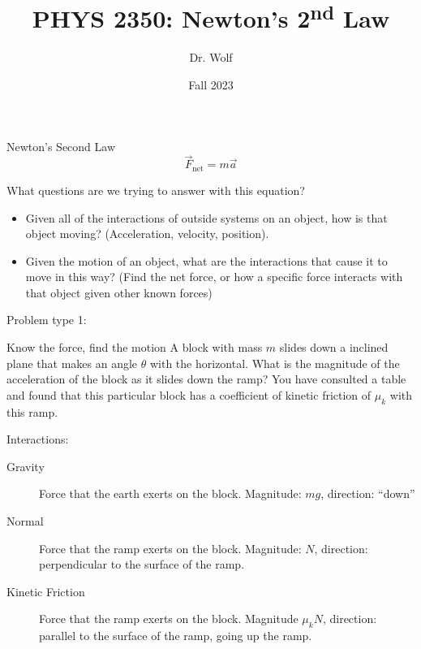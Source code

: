 \documentclass[aspectratio=169]{beamer}
\title{PHYS 2350: Newton's 2\textsuperscript{nd} Law}
\author{Dr. Wolf}
\date{Fall 2023}
\begin{document}
\begin{frame}
  \titlepage
\end{frame}

\begin{frame}
  {Newton's Second Law}
  \[
    \vec{F}_{\text{net}} = m\vec{a}
  \]
  \begin{block}
    {What questions are we trying to answer with this equation?}
      \begin{itemize}
        \item Given all of the interactions of outside systems on an object, how is that object
        moving? (Acceleration, velocity, position).  
        \item Given the motion of an object, what are the interactions that cause it to move in
        this way? (Find the net force, or how a specific force interacts with that object given
        other known forces)
      \end{itemize}
  \end{block}
\end{frame}

\begin{frame}
  {Problem type 1:}
  \begin{block}
    {Know the force, find the motion} A block with mass $m$ slides down a inclined plane that
    makes an angle $\theta$ with the horizontal.  What is the magnitude of the acceleration of
    the block as it slides down the ramp? You have consulted a table and found that this
    particular block has a coefficient of kinetic friction of $\mu_k$ with this ramp.
  \end{block}
  Interactions:
  \begin{description}
    \item[Gravity] Force that the earth exerts on the block.  Magnitude: $mg$, direction:
    ``down''
    \item[Normal] Force that the ramp exerts on the block. Magnitude: $N$, direction:
    perpendicular to the surface of the ramp.
    \item[Kinetic Friction] Force that the ramp exerts on the block.  Magnitude $\mu_k N$,
    direction: parallel to the surface of the ramp, going up the ramp.
  \end{description}
\end{frame}
\end{document}
